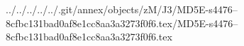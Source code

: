 ../../../../../.git/annex/objects/zM/J3/MD5E-s4476--8cfbc131bad0af8e1cc8aa3a3273f0f6.tex/MD5E-s4476--8cfbc131bad0af8e1cc8aa3a3273f0f6.tex
